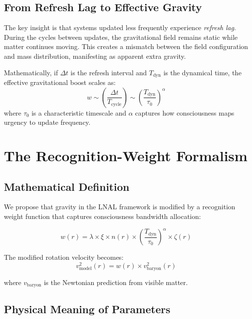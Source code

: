 \documentclass[10pt,a4paper]{article}
\begin{document}
\subsection{From Refresh Lag to Effective Gravity}

The key insight is that systems updated less frequently experience \emph{refresh lag}. During the cycles between updates, the gravitational field remains static while matter continues moving. This creates a mismatch between the field configuration and mass distribution, manifesting as apparent extra gravity.

Mathematically, if $\Delta t$ is the refresh interval and $T_{\text{dyn}}$ is the dynamical time, the effective gravitational boost scales as:
\begin{equation}
w \sim \left(\frac{\Delta t}{T_{\text{cycle}}}\right) \sim \left(\frac{T_{\text{dyn}}}{\tau_0}\right)^\alpha
\end{equation}
where $\tau_0$ is a characteristic timescale and $\alpha$ captures how consciousness maps urgency to update frequency.

\section{The Recognition-Weight Formalism}

\subsection{Mathematical Definition}

We propose that gravity in the LNAL framework is modified by a recognition weight function that captures consciousness bandwidth allocation:

\begin{equation}
w(r) = \lambda \times \xi \times n(r) \times \left(\frac{T_{\text{dyn}}}{\tau_0}\right)^\alpha \times \zeta(r)
\end{equation}

The modified rotation velocity becomes:
\begin{equation}
v_{\text{model}}^2(r) = w(r) \times v_{\text{baryon}}^2(r)
\end{equation}

where $v_{\text{baryon}}$ is the Newtonian prediction from visible matter.

\subsection{Physical Meaning of Parameters}
\end{document}
